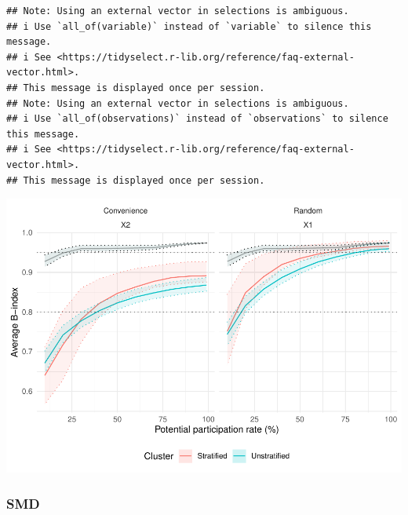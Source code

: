 \documentclass[
  man,floatsintext]{apa6}
\begin{document}
\begin{verbatim}
## Note: Using an external vector in selections is ambiguous.
## i Use `all_of(variable)` instead of `variable` to silence this message.
## i See <https://tidyselect.r-lib.org/reference/faq-external-vector.html>.
## This message is displayed once per session.
## Note: Using an external vector in selections is ambiguous.
## i Use `all_of(observations)` instead of `observations` to silence this message.
## i See <https://tidyselect.r-lib.org/reference/faq-external-vector.html>.
## This message is displayed once per session.
\end{verbatim}

\includegraphics{5---Analysis_files/figure-latex/unnamed-chunk-17-1.pdf}

\hypertarget{smd}{%
\subsubsection{SMD}\label{smd}}
\end{document}
